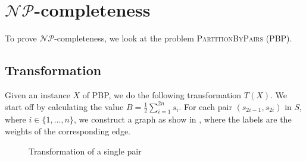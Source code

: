 \section{$\mathcal{NP}$-completeness}

To prove $\mathcal{NP}$-completeness, we look at the problem \textsc{PartitionByPairs} (PBP). 

\subsection{Transformation}
Given an instance $X$ of PBP, we do the following transformation $T(X)$. We start off by calculating the value $B = \frac{1}{2}\sum_{i=1}^{2n} s_i$. For each pair $(s_{2i-1}, s_{2i})$ in $S$,  where $i \in \lbrace 1,\dots, n \rbrace $, we construct a graph as show in , where the labels are the weights of the corresponding edge. 

\begin{figure}[!htb]
\centering
{}
\caption{Transformation of a single pair}
\label{fig:transform1}
\end{figure}

